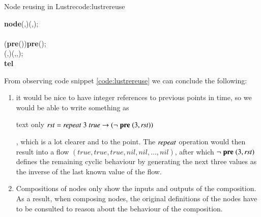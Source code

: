 \begin{texexptitled}{Node reusing in Lustre}{code:lustrereuse}
\begin{hscode}\SaveRestoreHook
{}%
%
%
%
\>[B]{}\textbf{node}\;\;(,\mathbin{:})\;\;(,\mathbin{:});{}\<[E]%
\\
\>[B]{}\<[E]%
\\
\>[B]{}\<[5]%
\>[5]{}\<[11]%
\>[11]{}\mathrel{=}\to {}\;(\textbf{pre}\;()\mathrel{=})\;\;\;\;\textbf{pre}\;()\mathbin{+};{}\<[E]%
\\
\>[B]{}\<[5]%
\>[5]{}(,)\mathrel{=}\;(,,\langle{});{}\<[E]%
\\
\>[B]{}\textbf{tel}{}\<[E]%
\ColumnHook
\end{hscode}\resethooks
\end{texexptitled}

\FloatBarrier
From observing code snippet \ref{code:lustrereuse} we can conclude the following:
\begin{enumerate}
\item  it would be nice to have integer references to previous points in time, so we would be able to write something as\\

\begin{changemargin}{1cm}{0cm}
\begin{expansionno}{text only}
\ensuremath{\Varid{rst}\mathrel{=}\Varid{repeat}\;\mathrm{3}\;\Varid{true}\to (\neg \;\textbf{pre}\;(\mathrm{3},\Varid{rst}))}
\end{expansionno}
\end{changemargin}%

, which is a lot clearer and to the point.
The \ensuremath{\Varid{repeat}} operation would then result into a flow $(true,true,true,nil,nil,\ldots,nil)$, after which \ensuremath{\neg \;\textbf{pre}\;(\mathrm{3},\Varid{rst})} defines the remaining cyclic behaviour by generating the next three values as the inverse of the last known value of the flow.
\item Compositions of nodes only show the inputs and outputs of the composition. As a result, when composing nodes, the original definitions of the nodes have to be consulted to reason about the behaviour of the composition. 
\end{enumerate}

